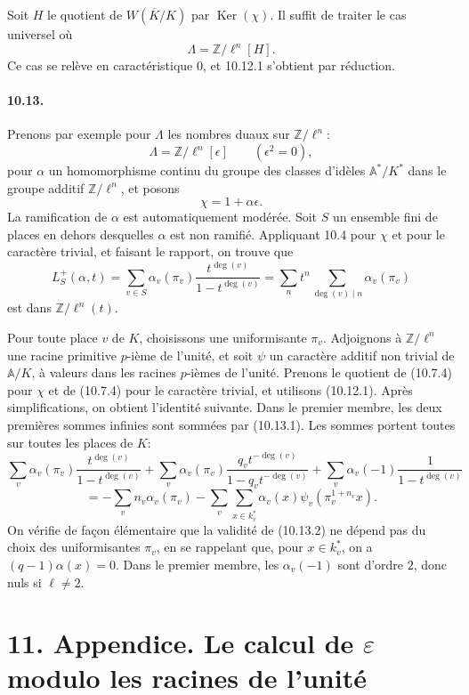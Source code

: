 \documentclass[10pt]{article}
\providecommand{\Ker}{\operatorname{Ker}}
\providecommand{\bbA}{\mathbb A}
\providecommand{\bbA}{\mathbb A}
\providecommand{\bbA}{\mathbb A}
\providecommand{\bbA}{\mathbb A}
\providecommand{\bbA}{\mathbb A}
\providecommand{\Ker}{\operatorname{Ker}}
\begin{document}
Soit \(H\) le quotient de \(W(\overline K/K)\) par \(\Ker(\chi)\). Il suffit de traiter le cas universel où
\[
\Lambda=\mathbb Z/\ell^n[H].
\]
Ce cas se relève en caractéristique \(0\), et 10.12.1 s'obtient par réduction.

\paragraph{10.13.} Prenons par exemple pour \(\Lambda\) les nombres duaux sur \(\mathbb Z/\ell^n\):
\[
\Lambda=\mathbb Z/\ell^n[\epsilon]\qquad(\epsilon^2=0),
\]
pour \(\alpha\) un homomorphisme continu du groupe des classes d'idèles \(\bbA^*/K^*\) dans le groupe additif \(\mathbb Z/\ell^n\), et posons
\[
\chi=1+\alpha\epsilon.
\]
La ramification de \(\alpha\) est automatiquement modérée. Soit \(S\) un ensemble fini de places en dehors desquelles \(\alpha\) est non ramifié. Appliquant 10.4 pour \(\chi\) et pour le caractère trivial, et faisant le rapport, on trouve que
\[
\tag{10.13.1}
L_S^+(\alpha,t)=
\sum_{v\in S}\alpha_v(\pi_v)\frac{t^{\deg(v)}}{1-t^{\deg(v)}}
=
\sum_n t^n\sum_{\deg(v)\mid n}\alpha_v(\pi_v)
\]
est dans \(\mathbb Z/\ell^n(t)\).

Pour toute place \(v\) de \(K\), choisissons une uniformisante \(\pi_v\). Adjoignons à \(\mathbb Z/\ell^n\) une racine primitive \(p\)-ième de l'unité, et soit \(\psi\) un caractère additif non trivial de \(\bbA/K\), à valeurs dans les racines \(p\)-ièmes de l'unité. Prenons le quotient de (10.7.4) pour \(\chi\) et de (10.7.4) pour le caractère trivial, et utilisons (10.12.1). Après simplifications, on obtient l'identité suivante. Dans le premier membre, les deux premières sommes infinies sont sommées par (10.13.1). Les sommes portent toutes sur toutes les places de \(K\):
\[
\tag{10.13.2}
\sum_v\alpha_v(\pi_v)\frac{t^{\deg(v)}}{1-t^{\deg(v)}}
+
\sum_v\alpha_v(\pi_v)\frac{q_vt^{-\deg(v)}}{1-q_vt^{-\deg(v)}}
+
\sum_v\alpha_v(-1)\frac{1}{1-t^{\deg(v)}}
\]
\[
=
-\sum_v n_v\alpha_v(\pi_v)
-\sum_v\sum_{x\in k_v^*}\alpha_v(x)\psi_v(\pi_v^{1+n_v}x).
\]
On vérifie de façon élémentaire que la validité de (10.13.2) ne dépend pas du choix des uniformisantes \(\pi_v\), en se rappelant que, pour \(x\in k_v^*\), on a \((q-1)\alpha(x)=0\). Dans le premier membre, les \(\alpha_v(-1)\) sont d'ordre \(2\), donc nuls si \(\ell\ne2\).

\section*{11. Appendice. Le calcul de \(\varepsilon\) modulo les racines de l'unité}
\end{document}
